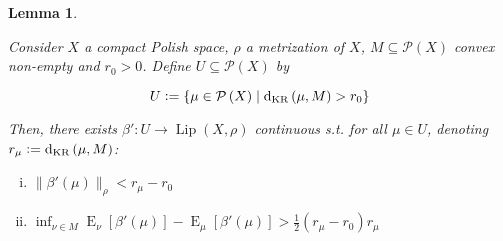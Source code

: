 \documentclass[11pt]{article}
\theoremstyle{definition}
\theoremstyle{plain}
\newtheorem{lemma}{Lemma}%
\newcommand{\N}[1]{\lVert #1 \rVert}
\DeclareMathOperator{\E}{E}
\newcommand{\PM}{\mathcal{P}}
\newcommand{\Lp}{{\operatorname{Lip}}}
\newcommand{\DKR}{\operatorname{d}_{\textnormal{KR}}}
\begin{document}
\begin{samepage}
\begin{lemma}
\label{lmm:savvy_outside}

Consider $X$ a compact Polish space, $\rho$ a metrization of $X$, $M \subseteq \PM\left(X\right)$ convex non-empty and $r_0 > 0$. Define $U \subseteq \PM\left(X\right)$ by

\begin{equation*}
U := \{\mu \in \PM\left(X\right) \mid \DKR\left(\mu,M\right) > r_0\}
\end{equation*}

Then, there exists $\beta': U \rightarrow \Lp\left(X,\rho\right)$ continuous s.t. for all $\mu \in U$, denoting $r_\mu:=\DKR\left(\mu,M\right)$:

\begin{enumerate}[i.]

\item $\N{\beta'\left(\mu\right)}_\rho < r_\mu - r_0$
\item $\inf_{\nu \in M} \E_\nu\left[\beta'\left(\mu\right)\right] - \E_\mu\left[\beta'\left(\mu\right)\right] > \frac{1}{2} \left(r_\mu - r_0\right) r_\mu$

\end{enumerate}

\end{lemma}
\end{samepage}
\end{document}
